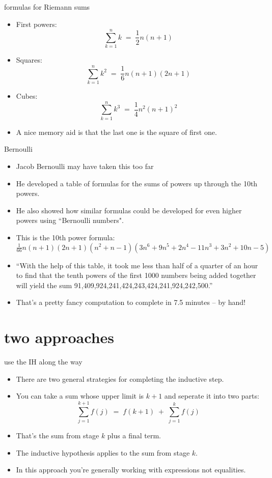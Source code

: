 \documentclass[handout,landscape]{beamer}
\begin{document}
\begin{frame}{formulas for Riemann sums}
\begin{itemize}
\item First powers:
\[ \sum_{k=1}^n k \; = \; \frac{1}{2} n(n+1) \] \pause
\item Squares:
\[ \sum_{k=1}^n k^2 \; = \; \frac{1}{6} n(n+1)(2n+1) \] \pause
\item Cubes:
\[ \sum_{k=1}^n k^3 \; = \; \frac{1}{4} n^2(n+1)^2 \] \pause
\item A nice memory aid is that the last one is the square of first one. 
\end{itemize}
\end{frame}

\begin{frame}{Bernoulli}
\begin{itemize}
\item Jacob Bernoulli may have taken this too far\textellipsis \pause
\item He developed a table of formulas for the sums of powers up through the 10th powers.\pause
\item He also showed how similar formulas could be developed for even higher powers using ``Bernoulli numbers". \pause 
\item This is the 10th power formula: \newline
\hspace{-1in}$\frac{1}{66} n(n+1)(2n+1)(n^2+n-1)(3n^6+9n^5+2n^4-11n^3+3n^2+10n-5)$
\pause
\item ``With the help of this table, it took me less than half of a quarter of an hour to find that the tenth powers of the first 1000 numbers being added together will yield the sum 91,409,924,241,424,243,424,241,924,242,500.'' \pause
\item That's a pretty fancy computation to complete in 7.5 minutes -- by hand!
\end{itemize}
\end{frame}

\section{two approaches}

\begin{frame}{use the IH along the way}
\begin{itemize}
\item There are two general strategies for completing the inductive step. \pause
\item You can take a sum whose upper limit is $k+1$ and seperate it into two parts: \pause
\[ \sum_{j=1}^{k+1} f(j) \; = \; f(k+1) \; + \; \sum_{j=1}^{k} f(j) \] \pause
\item That's the sum from stage $k$ plus a final term. \pause
\item The inductive hypothesis applies to the sum from stage $k$. \pause
\item In this approach you're generally working with expressions not equalities.
\end{itemize}
\end{frame}
\end{document}
